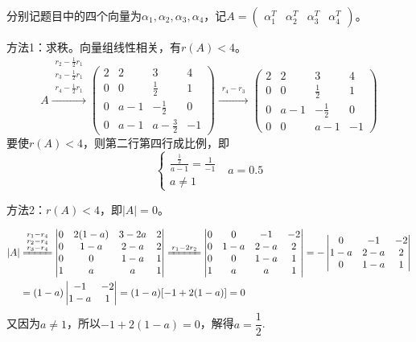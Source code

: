 \documentclass[a4paper]{report}
\begin{document}
\begin{jie}
分别记题目中的四个向量为$\alpha_1,\alpha_2,\alpha_3,\alpha_4$，记$A=
\begin{pmatrix}
\alpha_1^T&\alpha_2^T&\alpha_3^T&\alpha_4^T
\end{pmatrix}
$。

方法1：求秩。向量组线性相关，有$r(A)<4$。
\begin{equation*}
A\xrightarrow{\substack{r_{2}-\frac{1}{2}r_{1}\\ r_{3}-\frac{1}{2}r_{1}\\ r_{4}-\frac{1}{2}r_{1}}}
{
\begin{pmatrix}
2& 2&3&4\\ 0&0&\frac{1}{2}&1\\ 0&a-1&-\frac{1}{2}&0\\ 0&a-1&a-\frac{3}{2}&-1
\end{pmatrix}
}\xrightarrow{\substack{r_{4}-r_{3}}}
{
\begin{pmatrix}
2& 2&3&4\\ 0&0&\frac{1}{2}&1\\ 0&a-1&-\frac{1}{2}&0\\ 0&0&a-1&-1
\end{pmatrix}
}
\end{equation*}
要使$r(A)<4$，则第二行第四行成比例，即
\begin{equation*}
\begin{cases}
\frac{\frac{1}{2}}{a-1}=\frac{1}{-1}\\
a\neq 1
\end{cases}~~~a=0.5
\end{equation*}

方法2：$r(A)<4$，即$|A|=0$。

\begin{align*}
|A|&\xlongequal{\substack{r_1-r_4 \\ r_2-r_4\\ r_3-r_4}}
\begin{vmatrix}
0&2(1-a)&3-2a&2\\ 0&1-a&2-a&2\\ 0&0&1-a&1\\ 1&a&a&1
\end{vmatrix}
\xlongequal{\substack{r_1-2r_2}}
\begin{vmatrix}
0&0&-1&-2\\ 0&1-a&2-a&2\\ 0&0&1-a&1\\ 1&a&a&1
\end{vmatrix}=-\begin{vmatrix}
0&-1&-2\\ 1-a&2-a&2\\ 0&1-a&1
\end{vmatrix}\\ &=(1-a)\begin{vmatrix}
-1&-2\\ 1-a&1
\end{vmatrix}=(1-a)[-1+2(1-a)]=0
\end{align*}
又因为$a\neq 1$，所以$-1+2(1-a)=0$，解得$a=\dfrac{1}{2}$.
\end{jie}
\end{document}
